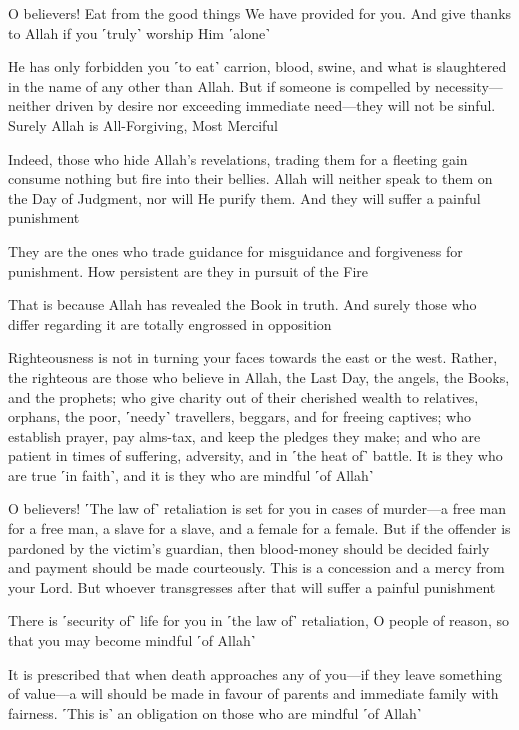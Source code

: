 O believers! Eat from the good things We have provided for you. And give thanks to Allah if you ˹truly˺ worship Him ˹alone˺

He has only forbidden you ˹to eat˺ carrion, blood, swine, and what is slaughtered in the name of any other than Allah. But if someone is compelled by necessity—neither driven by desire nor exceeding immediate need—they will not be sinful. Surely Allah is All-Forgiving, Most Merciful

Indeed, those who hide Allah’s revelations, trading them for a fleeting gain consume nothing but fire into their bellies. Allah will neither speak to them on the Day of Judgment, nor will He purify them. And they will suffer a painful punishment

They are the ones who trade guidance for misguidance and forgiveness for punishment. How persistent are they in pursuit of the Fire

That is because Allah has revealed the Book in truth. And surely those who differ regarding it are totally engrossed in opposition

Righteousness is not in turning your faces towards the east or the west. Rather, the righteous are those who believe in Allah, the Last Day, the angels, the Books, and the prophets; who give charity out of their cherished wealth to relatives, orphans, the poor, ˹needy˺ travellers, beggars, and for freeing captives; who establish prayer, pay alms-tax, and keep the pledges they make; and who are patient in times of suffering, adversity, and in ˹the heat of˺ battle. It is they who are true ˹in faith˺, and it is they who are mindful ˹of Allah˺

O believers! ˹The law of˺ retaliation is set for you in cases of murder—a free man for a free man, a slave for a slave, and a female for a female. But if the offender is pardoned by the victim’s guardian, then blood-money should be decided fairly and payment should be made courteously. This is a concession and a mercy from your Lord. But whoever transgresses after that will suffer a painful punishment

There is ˹security of˺ life for you in ˹the law of˺ retaliation, O people of reason, so that you may become mindful ˹of Allah˺

It is prescribed that when death approaches any of you—if they leave something of value—a will should be made in favour of parents and immediate family with fairness. ˹This is˺ an obligation on those who are mindful ˹of Allah˺

